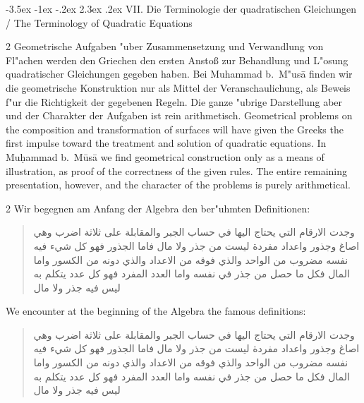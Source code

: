 \documentclass[10pt,a4paper]{article}
\makeatletter
\renewcommand{\switchcolumn}{\syncronize\nointerlineskip\columnbreak}
\newcommand{\RL}[1]{\beginR#1\endR}
\newcommand{\ar}[1]{{\arabicfont\RL{#1}}}
\renewcommand{\section}{\@startsection{section}{1}{\z@}%
  {-3.5ex \@plus -1ex \@minus -.2ex}%
  {2.3ex \@plus .2ex}%
  {\normalfont\Large\bfseries\color{sectioncolor}}}
\makeatother
\begin{document}
\section{VII. Die Terminologie der quadratischen Gleichungen / The Terminology of Quadratic Equations}

\begin{paracol}{2}
Geometrische Aufgaben "uber Zusammensetzung und Verwandlung von Fl"achen werden den Griechen den ersten Ansto\ss{} zur Behandlung und L"osung quadratischer Gleichungen gegeben haben. Bei Muhammad b.\ M"us\=a finden wir die geometrische Konstruktion nur als Mittel der Veranschaulichung, als Beweis f"ur die Richtigkeit der gegebenen Regeln. Die ganze "ubrige Darstellung aber und der Charakter der Aufgaben ist rein arithmetisch.
\switchcolumn
Geometrical problems on the composition and transformation of surfaces will have given the Greeks the first impulse toward the treatment and solution of quadratic equations. In Mu\d{h}ammad b.\ M\=us\=a we find geometrical construction only as a means of illustration, as proof of the correctness of the given rules. The entire remaining presentation, however, and the character of the problems is purely arithmetical.
\end{paracol}

\begin{paracol}{2}
Wir begegnen am Anfang der Algebra den ber"uhmten Definitionen:

\begin{quote}
\ar{وجدت الارقام التي يحتاج اليها في حساب الجبر والمقابلة على ثلاثة اضرب وهي اصاغ وجذور واعداد مفردة ليست من جذر ولا مال فاما الجذور فهو كل شيء فيه نفسه مضروب من الواحد والذي فوقه من الاعداد والذي دونه من الكسور واما المال فكل ما حصل من جذر في نفسه واما العدد المفرد فهو كل عدد يتكلم به ليس فيه جذر ولا مال}
\end{quote}
\switchcolumn
We encounter at the beginning of the Algebra the famous definitions:

\begin{quote}
\ar{وجدت الارقام التي يحتاج اليها في حساب الجبر والمقابلة على ثلاثة اضرب وهي اصاغ وجذور واعداد مفردة ليست من جذر ولا مال فاما الجذور فهو كل شيء فيه نفسه مضروب من الواحد والذي فوقه من الاعداد والذي دونه من الكسور واما المال فكل ما حصل من جذر في نفسه واما العدد المفرد فهو كل عدد يتكلم به ليس فيه جذر ولا مال}
\end{quote}
\end{paracol}
\end{document}
